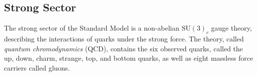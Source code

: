 

\subsection{Strong Sector}






The strong sector of the Standard Model is a non-abelian $\mathrm{SU}(3)_c$ gauge theory, describing the interactions of quarks under the strong force. The theory, called \emph{quantum chromodynamics} (QCD), contains the six observed quarks, called the up, down, charm, strange, top, and bottom quarks, as well as eight massless force carriers called gluons. 

